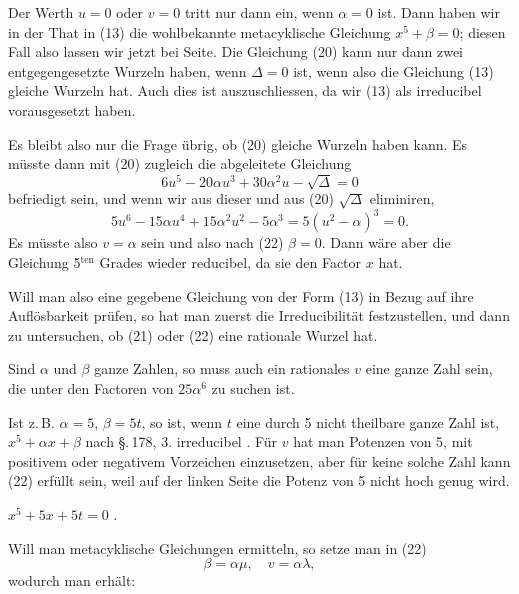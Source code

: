 
Der Werth $u=0$ oder $v=0$ tritt nur dann ein, wenn
$\alpha=0$ ist. Dann haben wir in der That in (13) die wohlbekannte
 metacyklische Gleichung $x^5+\beta=0$; diesen Fall also
lassen wir jetzt bei Seite. Die Gleichung (20) kann nur dann
zwei entgegengesetzte Wurzeln haben, wenn $\Delta=0$ ist, wenn
also die Gleichung (13) gleiche Wurzeln hat. Auch dies ist
auszuschliessen, da wir (13) als irreducibel vorausgesetzt haben.

Es bleibt also nur die Frage \"ubrig, ob (20) gleiche Wurzeln
haben kann. Es m\"usste dann mit (20) zugleich die abgeleitete
Gleichung
\[
6u^5-20\alpha u^3+30\alpha^2u-\sqrt{\Delta}=0
\]
befriedigt sein, und wenn wir aus dieser und aus (20) $\sqrt{\Delta}$
eliminiren,
\[
5u^6-15\alpha u^4+15\alpha^2u^2-5\alpha^3=5(u^2-\alpha)^3=0.
\]
Es m\"usste also $v=\alpha$ sein und also nach (22) $\beta=0$.
Dann w\"are aber die Gleichung 5$^{\text{ten}}$ Grades wieder reducibel, da
sie den Factor $x$ hat.

Will man also eine gegebene Gleichung von der Form (13)
in Bezug auf ihre Aufl\"osbarkeit pr\"ufen, so hat man zuerst die
Irreducibilit\"at festzustellen, und dann zu untersuchen, ob (21)
oder (22) eine rationale Wurzel hat.

Sind $\alpha$ und $\beta$ ganze Zahlen, so muss auch ein rationales $v$
eine ganze Zahl sein, die unter den Factoren von $25\alpha^6$ zu
suchen ist.

Ist z.\,B. $\alpha=5$, $\beta=5t$, so ist, wenn $t$ eine durch 5 nicht
theilbare ganze Zahl ist, $x^5+\alpha x+\beta$ nach \S.\,178, 3. irreducibel
. F\"ur $v$ hat man Potenzen von 5, mit positivem oder
negativem Vorzeichen einzusetzen, aber f\"ur keine solche Zahl
kann (22) erf\"ullt sein, weil auf der linken Seite die Potenz von
5 nicht hoch genug wird.

$x^5+5x+5t=0$ .

Will man metacyklische Gleichungen ermitteln, so setze man
in (22)
\[
\beta=\alpha\mu,\quad v=\alpha\lambda,
\]
wodurch man erh\"alt:
